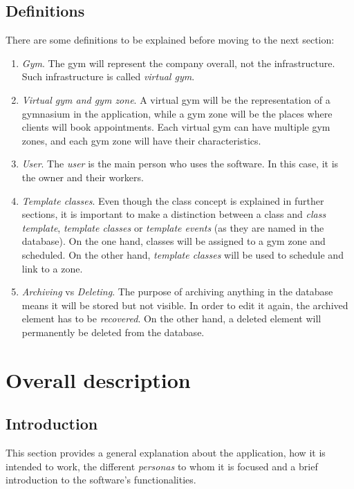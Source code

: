 \documentclass[a4paper, 12pt, oneside]{book}
\begin{document}
\subsection{Definitions}
There are some definitions to be explained before moving to the next section:
\begin{enumerate}[label = -]
	\item \emph{Gym}. The gym will represent the company overall, not the infrastructure. Such infrastructure is called \emph{virtual gym}.
	\item \emph{Virtual gym and gym zone}. A virtual gym will be the representation of a gymnasium in the application, while a gym zone will be the places where clients will book appointments. Each virtual gym can have multiple gym zones, and each gym zone will have their characteristics.
	\item \emph{User}. The \emph{user} is the main person who uses the software. In this case, it is the owner and their workers.
	\item \emph{Template classes}. Even though the class concept is explained in further sections, it is important to make a distinction between a class and \emph{class template}, \emph{template classes} or \emph{template events} (as they are named in the database). On the one hand, classes will be assigned to a gym zone and scheduled. On the other hand, \emph{template classes} will be used to schedule and link to a zone. 
	\item \emph{Archiving} vs \emph{Deleting}. The purpose of archiving anything in the database means it will be stored but not visible. In order to edit it again, the archived element has to be \emph{recovered}. On the other hand, a deleted element will permanently be deleted from the database.
\end{enumerate}
\section{Overall description}
\subsection{Introduction}
This section provides a general explanation about the application, how it is intended to work, the different \emph{personas} to whom it is focused and a brief introduction to the software's functionalities.
\end{document}
